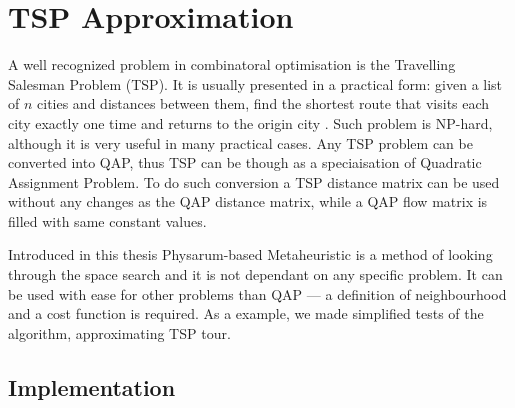 \documentclass[english,a4paper,twoside]{ppfcmthesis}
\begin{document}
\begin{table}
  \bigskip\bigskip
\end{table}

\begin{table}
  \bigskip\bigskip
  \bigskip\bigskip
\end{table}

\begin{table}
\end{table}

\begin{table}
  \bigskip\bigskip
  \bigskip\bigskip
\end{table}

\begin{table}
\end{table}

\chapter{TSP Approximation}
\label{chapter:tsp}

A well recognized problem in combinatoral optimisation is the Travelling Salesman Problem (TSP). It is usually presented in a practical form: given a list of $n$ cities and distances between them, find the shortest route that visits each city exactly one time and returns to the origin city \cite{kruskal1956shortest}. Such problem is NP-hard, although it is very useful in many practical cases. Any TSP problem can be converted into QAP, thus TSP can be though as a speciaisation of Quadratic Assignment Problem. To do such conversion a TSP distance matrix can be used without any changes as the QAP distance matrix, while a QAP flow matrix is filled with same constant values.

Introduced in this thesis Physarum-based Metaheuristic is a method of looking through the space search and it is not dependant on any specific problem. It can be used with ease for other problems than QAP --- a definition of neighbourhood and a cost function is required. As a example, we made simplified tests of the algorithm, approximating TSP tour.


\section*{Implementation}
\end{document}
